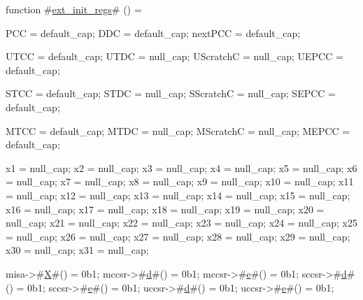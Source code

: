 function #\hyperref[sailRISCVzextzyinitzyregs]{ext\_init\_regs}# () = {
  PCC = default_cap;
  DDC = default_cap;
  nextPCC = default_cap;

  UTCC = default_cap;
  UTDC = null_cap;
  UScratchC = null_cap;
  UEPCC = default_cap;

  STCC = default_cap;
  STDC = null_cap;
  SScratchC = null_cap;
  SEPCC = default_cap;

  MTCC = default_cap;
  MTDC = null_cap;
  MScratchC = null_cap;
  MEPCC = default_cap;

  x1  = null_cap;
  x2  = null_cap;
  x3  = null_cap;
  x4  = null_cap;
  x5  = null_cap;
  x6  = null_cap;
  x7  = null_cap;
  x8  = null_cap;
  x9  = null_cap;
  x10 = null_cap;
  x11 = null_cap;
  x12 = null_cap;
  x13 = null_cap;
  x14 = null_cap;
  x15 = null_cap;
  x16 = null_cap;
  x17 = null_cap;
  x18 = null_cap;
  x19 = null_cap;
  x20 = null_cap;
  x21 = null_cap;
  x22 = null_cap;
  x23 = null_cap;
  x24 = null_cap;
  x25 = null_cap;
  x26 = null_cap;
  x27 = null_cap;
  x28 = null_cap;
  x29 = null_cap;
  x30 = null_cap;
  x31 = null_cap;

  misa->#\hyperref[sailRISCVzX]{X}#() = 0b1;
  mccsr->#\hyperref[sailRISCVzd]{d}#() = 0b1;
  mccsr->#\hyperref[sailRISCVze]{e}#() = 0b1;
  sccsr->#\hyperref[sailRISCVzd]{d}#() = 0b1;
  sccsr->#\hyperref[sailRISCVze]{e}#() = 0b1;
  uccsr->#\hyperref[sailRISCVzd]{d}#() = 0b1;
  uccsr->#\hyperref[sailRISCVze]{e}#() = 0b1;
}
